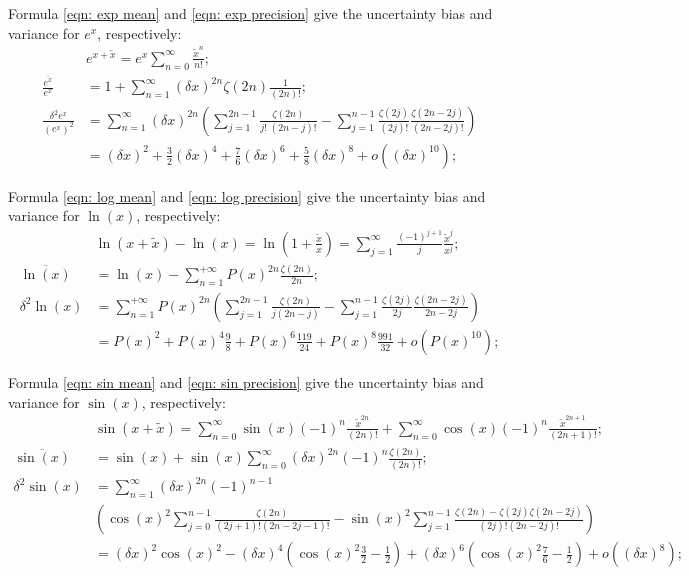 \documentclass[twoside]{article}
\numberwithin{equation}{section}
\begin{document}
\fi


Formula \eqref{eqn: exp mean} and \eqref{eqn: exp precision} give the uncertainty bias and variance for $e^x$, respectively:
\begin{align}
\label{eqn: exp Taylor}
& e^{x + \tilde{x}} = e^x \sum_{n=0}^{\infty} \frac{\tilde{x}^n}{n!}; \\
\label{eqn: exp mean}
\frac{\overline{e^x}}{e^x}  &= 1 + \sum_{n=1}^{\infty} (\delta x)^{2n} \zeta(2n) \frac{1}{(2n)!}; \\
\label{eqn: exp precision}
\frac{\delta^2 e^x}{(e^x)^2} &= \sum_{n=1}^{\infty} (\delta x)^{2n}  \left( \sum_{j=1}^{2n-1} \frac{\zeta(2n)}{j!\;(2n - j)!} 
 -\sum_{j=1}^{n-1} \frac{\zeta(2j)}{(2j)!} \frac{\zeta(2n - 2j)}{(2n - 2j)!} \right) \\
 &= (\delta x)^2 + \frac{3}{2} (\delta x)^4 + \frac{7}{6} (\delta x)^6 + \frac{5}{8} (\delta x)^8 + o((\delta x)^{10});
\end{align}

Formula \eqref{eqn: log mean} and \eqref{eqn: log precision} give the uncertainty bias and variance for $\ln(x)$, respectively:
\begin{align}
\label{eqn: log Taylor}
& \ln(x + \tilde{x}) - \ln(x) = \ln(1 + \frac{\tilde{x}}{x}) = \sum_{j=1}^{\infty} \frac{(-1)^{j+1}}{j} \frac{\tilde{x}^j}{x^j}; \\
\label{eqn: log mean}
\overline{\ln(x)}  &= \ln(x) -\sum_{n=1}^{+\infty} P(x)^{2n} \frac{\zeta(2n)}{2n}; \\
\label{eqn: log precision}
\delta^2 \ln(x) &= \sum_{n=1}^{+\infty} P(x)^{2n} \left(\sum_{j=1}^{2n-1} \frac{\zeta(2n)}{j (2n-j)}
   - \sum_{j=1}^{n-1} \frac{\zeta(2j)}{2j} \frac{\zeta(2n - 2j)}{2n - 2j} \right) \\
 &= P(x)^2 + P(x)^4 \frac{9}{8}  + P(x)^6 \frac{119}{24} + P(x)^8 \frac{991}{32} + o(P(x)^{10}); 
\end{align}

Formula \eqref{eqn: sin mean} and \eqref{eqn: sin precision} give the uncertainty bias and variance for $\sin(x)$, respectively:
\begin{align}
\label{eqn: sin Taylor}
& \sin(x + \tilde{x}) = \sum_{n=0}^{\infty} \sin(x) (-1)^{n} \frac{\tilde{x}^{2n}}{(2n)!} + \sum_{n=0}^{\infty} \cos(x) (-1)^n \frac{\tilde{x}^{2n+1}}{(2n + 1)!}; \\
\label{eqn: sin mean}
\overline{\sin(x)} &= \sin(x) + \sin(x) \sum_{n=0}^{\infty} (\delta x)^{2n} (-1)^{n} \frac{\zeta(2n)}{(2n)!}; \\
\label{eqn: sin precision}
\delta^2 \sin(x) &= \sum_{n=1}^{\infty} (\delta x)^{2n} (-1)^{n - 1} \\
 & \left( \cos(x)^2 \sum_{j=0}^{n-1} \frac{\zeta(2n)}{(2j+1)!(2n-2j-1)!}
      - \sin(x)^2 \sum_{j=1}^{n-1} \frac{\zeta(2n) - \zeta(2j) \zeta(2n-2j)}{(2j)!(2n-2j)!} \right) \nonumber \\ 
 &=  (\delta x)^2 \cos(x)^2 - (\delta x)^4 (\cos(x)^2 \frac{3}{2} - \frac{1}{2}) + (\delta x)^6 (\cos(x)^2 \frac{7}{6} - \frac{1}{2})  + o((\delta x)^8);
\end{align}
\end{document}
